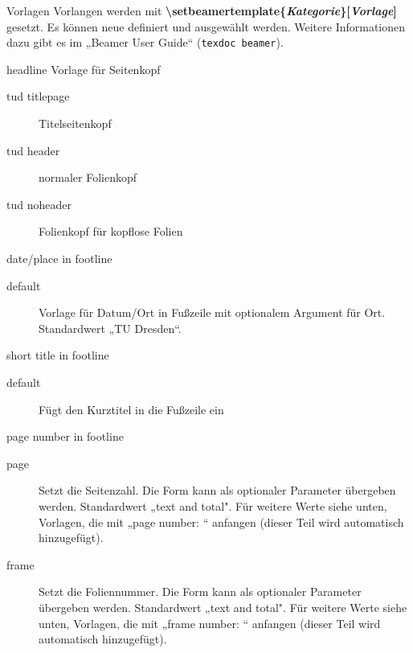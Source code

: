 \documentclass[presentation,t]{beamer}
\begin{document}
\begin{frame}[label=sec-2-2-4]{Vorlagen}
Vorlangen werden mit 
\textbf{\textbackslash setbeamertemplate\{\emph{Kategorie}\}[\emph{Vorlage}]}
gesetzt. Es können neue
definiert und ausgewählt werden. Weitere Informationen dazu gibt es im
„Beamer User Guide“ (\texttt{texdoc beamer}).
\begin{block}{headline}
Vorlage für Seitenkopf
\begin{description}
\item[{tud titlepage}] Titelseitenkopf
\item[{tud header}] normaler Folienkopf
\item[{tud noheader}] Folienkopf für kopflose Folien
\end{description}
\end{block}

\begin{block}{date/place in footline}

\begin{description}
\item[{default}] Vorlage für Datum/Ort in Fußzeile mit optionalem Argument
für Ort. Standardwert „TU Dresden“.
\end{description}
\end{block}

\begin{block}{short title in footline}

\begin{description}
\item[{default}] Fügt den Kurztitel in die Fußzeile ein
\end{description}
\end{block}

\begin{block}{page number in footline}
\small
\begin{description}
\item[{page}] Setzt die Seitenzahl. Die Form kann als optionaler Parameter
übergeben werden. Standardwert „text and total". Für weitere Werte
siehe unten, Vorlagen, die mit „page number: “ anfangen (dieser Teil
wird automatisch hinzugefügt).
\item[{frame}] Setzt die Foliennummer. Die Form kann als optionaler Parameter
übergeben werden. Standardwert „text and total". Für weitere Werte
siehe unten, Vorlagen, die mit „frame number: “ anfangen (dieser Teil
wird automatisch hinzugefügt).
\end{description}
\end{block}
\end{frame}
\end{document}

